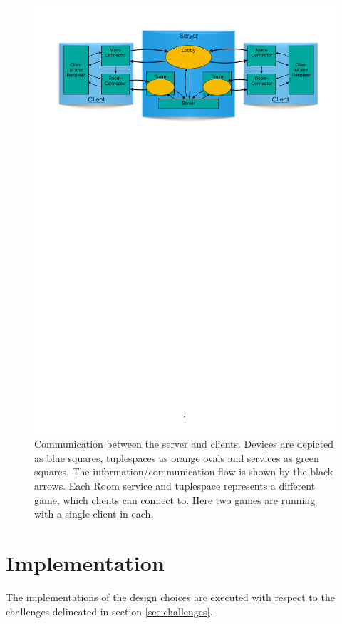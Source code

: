 \begin{figure}[H]
    \centering
    \includegraphics[width = \textwidth]{figures/CommunicationFigure.pdf}
    \caption{Communication between the server and clients. Devices are depicted as blue squares, tuplespaces as orange ovals and services as green squares. The information/communication flow is shown by the black arrows. Each Room service and tuplespace represents a different game, which clients can connect to. Here two games are running with a single client in each.}
    \label{fig:CommunicationOverview}
\end{figure}


\section{Implementation}

The implementations of the design choices are executed with respect to the challenges delineated in section \ref{sec:challenges}.

